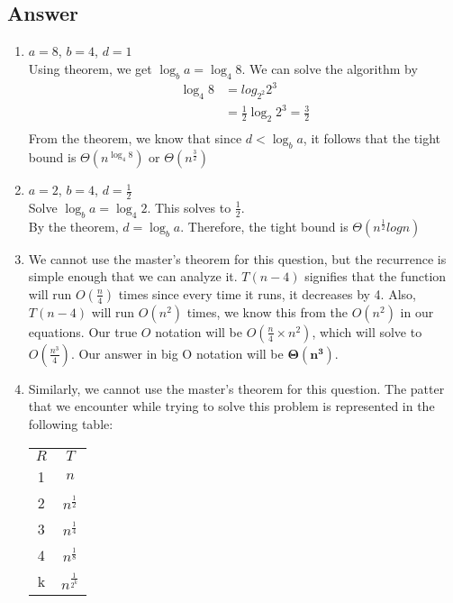 \documentclass[
	12pt
]{fphw}
\begin{document}
\subsection*{Answer}
\begin{enumerate} %
	\item $a = 8$, $b = 4$, $d = 1$\\
	Using theorem, we get $\log_b a = \log_4 8$. We can solve the
	algorithm by
	\begin{align*}
		\log_4 8 &= log_{2^2} 2^3 \\
		&= \frac{1}{2} \log_2 2^3 = \frac{3}{2}\\
	\end{align*}
	From the theorem, we know that since $d < \log_b a$, it follows that the tight bound is $\Theta(n^{\log_4 8})$ or $\boxed{\Theta(n^{\frac{3}{2}})}$
	\item $a = 2$, $b = 4$, $d = \frac{1}{2}$ \\
	Solve $\log_b a = \log_4 2$. This solves to $\frac{1}{2}$.\\
	By the theorem, $d = \log_b a$. Therefore, the tight bound is $\boxed{\Theta(n^{\frac{1}{2}}logn)}$
	\item We cannot use the master's theorem for this question, but the recurrence is simple enough that we can analyze it. $T(n-4)$ signifies that the function will run $O(\frac{n}{4})$ times since every time it runs, it decreases by 4.
	Also, $T(n-4)$ will run $O(n^2)$ times, we know this from the $O(n^2)$ in our equations. Our true $O$ notation will be $O(\frac{n}{4} \times n^2)$, which will solve to $O(\frac{n^3}{4})$. Our answer in big O notation will be $\boxed{\mathbf{\Theta(n^3)}}$.
	\item Similarly, we cannot use the master's theorem for this question. The patter that we encounter while trying to solve this problem is represented in the following table:
	\begin{center}
		\begin{tabular}{c | c}
			$R$ & $T$ \\
			1 & $n$ \\
			2 & $n^\frac{1}{2}$ \\
			3 & $n^\frac{1}{4}$ \\
			4 & $n^\frac{1}{8}$ \\
			k & $n^\frac{1}{2^k}$ \\
		\end{tabular}
	\end{center}
	

\end{enumerate}
\end{document}
